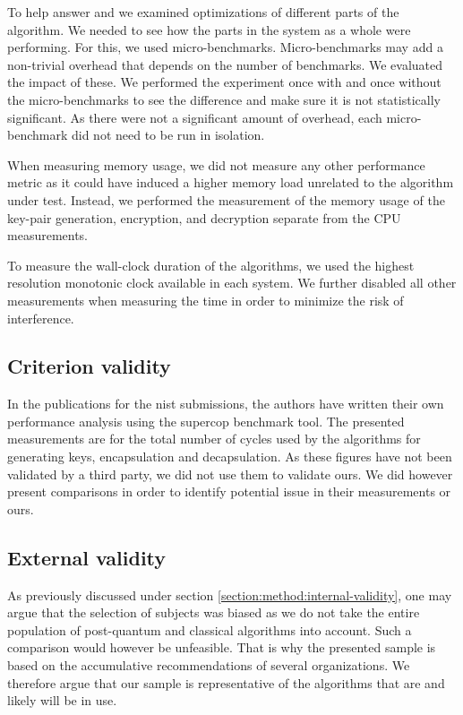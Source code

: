 To help answer  and  we examined optimizations of different parts of the algorithm. We needed to see how the parts in the system as a whole were performing. For this, we used micro-benchmarks. Micro-benchmarks may add a non-trivial overhead that depends on the number of benchmarks. We evaluated the impact of these. We performed the experiment once with and once without the micro-benchmarks to see the difference and make sure it is not statistically significant. As there were not a significant amount of overhead, each micro-benchmark did not need to be run in isolation.

When measuring memory usage, we did not measure any other performance metric as it could have induced a higher memory load unrelated to the algorithm under test. Instead, we performed the measurement of the memory usage of the key-pair generation, encryption, and decryption separate from the CPU measurements.

To measure the wall-clock duration of the algorithms, we used the highest resolution monotonic clock available in each system. We further disabled all other measurements when measuring the time in order to minimize the risk of interference.

\subsection{Criterion validity}

In the publications for the \gls{nist} submissions, the authors have written their own performance analysis using the \gls{supercop} benchmark tool. The presented measurements are for the total number of cycles used by the algorithms for generating keys, encapsulation and decapsulation. As these figures have not been validated by a third party, we did not use them to validate ours. We did however present comparisons in order to identify potential issue in their measurements or ours.

\subsection{External validity}

As previously discussed under section \ref{section:method:internal-validity}, one may argue that the selection of subjects was biased as we do not take the entire population of post-quantum and classical algorithms into account. Such a comparison would however be unfeasible. That is why the presented sample is based on the accumulative recommendations of several organizations. We therefore argue that our sample is representative of the algorithms that are and likely will be in use.

